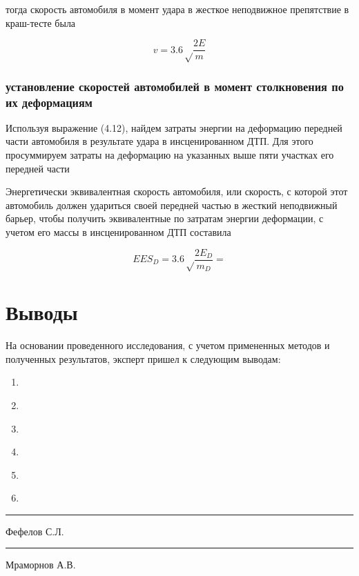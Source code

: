 тогда скорость автомобиля в момент удара в жесткое неподвижное препятствие в краш-тесте была

{\large \[v=3.6\sqrt\frac{2E}{m}\]}



\subsubsection{установление скоростей автомобилей в момент
	столкновения по их деформациям}
	

	

Используя выражение (4.12), найдем затраты энергии на деформацию
передней части автомобиля в результате удара в инсценированном ДТП. Для этого просуммируем затраты на деформацию на указанных выше пяти участках его передней части


Энергетически эквивалентная скорость автомобиля, или скорость,
с которой этот автомобиль должен удариться своей передней частью
в жесткий неподвижный барьер, чтобы получить эквивалентные по затратам энергии деформации, с учетом его массы в инсценированном ДТП  составила

{\large 
\[ EES_{D}=3.6\sqrt\frac{2E_{D}}{m_{D}}=\]
}



%


%

%
%
%


%



\section{Выводы}
	На основании проведенного исследования, с учетом примененных методов и полученных результатов, эксперт пришел к следующим выводам:
\begin{enumerate}
\item \textbf{ }
\item  \textbf{ }
\item  \textbf{ }
\item \textbf{ }
\item  \textbf{ }
\item  \textbf{ }  
\end{enumerate}
    
\vspace{6mm}

  \hfill    \rule{45mm}{0.1 mm}     {Фефелов С.Л.}\\[5mm]

  \hfill    \rule{45mm}{0.1 mm}   {Мраморнов А.В.}\\
